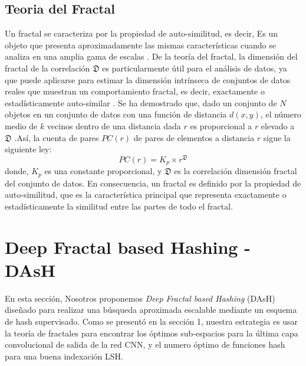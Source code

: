  
 
\subsection{Teoria del Fractal}
 
Un fractal se caracteriza por la propiedad de auto-similitud, es decir, Es un objeto que presenta aproximadamente las mismas características cuando se analiza en una amplia gama de escalas \cite{DBLP:journals/jidm/TrainaTWF10,DBLP:fractal2016}. De la teoría del fractal, la dimensión del fractal de la correlación $\mathfrak{D}$ es particularmente útil para el análisis de datos, ya que puede aplicarse para estimar la dimensión intrínseca de conjuntos de datos reales que muestran un comportamiento fractal, es decir, exactamente o estadísticamente auto-similar \cite{Belussi:1995:ESS:645921.673166}. Se ha demostrado que, dado un conjunto de $N$ objetos en un conjunto de datos con una función de distancia $d(x,y)$, el número medio de $k$ vecinos dentro de una distancia dada $r$ es proporcional a $r$ elevado a $\mathfrak{D}$  \cite{Arantes_thefractal}.Así, la cuenta de pares $PC(r)$ de pares de elementos a distancia $r$ sigue la siguiente ley:
\begin{equation}\label{eq:fractal}
	   PC(r) = K_p \times r^{\mathfrak{D}}		
	\end{equation}
donde, $K_p$ es una constante proporcional, y $\mathfrak{D}$ es la correlación dimensión fractal del conjunto de datos.     En consecuencia, un fractal es definido por la propiedad de auto-similitud, que es la característica principal que representa exactamente o estadísticamente la similitud entre las partes de todo el fractal.  
 
 
\section{Deep Fractal based  Hashing - DAsH}

En esta sección, Nosotros proponemos \textit{Deep Fractal based  Hashing} (DAsH) diseñado para realizar una búsqueda aproximada escalable mediante un esquema de hash supervisado. Como se presentó en la sección 1, nuestra estrategia es usar la teoría de fractales para encontrar los óptimos sub-espacios para la última capa convolucional de salida de la red CNN, y el numero óptimo de funciones hash para una buena indexación LSH. 

